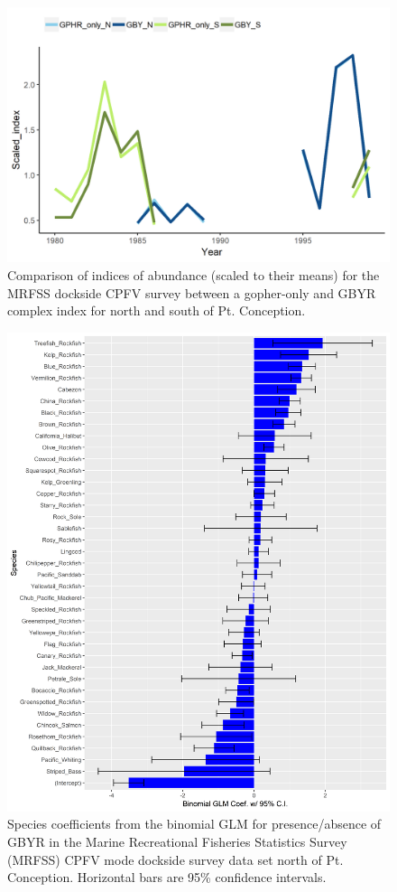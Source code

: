 \documentclass[12pt,]{article}
\begin{document}
\begin{figure}
\centering
\includegraphics{Figures/MRFSS_index_compare.png}
\caption{Comparison of indices of abundance (scaled to their means) for
the MRFSS dockside CPFV survey between a gopher-only and GBYR complex
index for north and south of Pt. Conception.
\label{fig:MRFSS_index_compare}}
\end{figure}

\begin{figure}
\centering
\includegraphics{Figures/Fleet10_SM_filter.png}
\caption{Species coefficients from the binomial GLM for presence/absence
of GBYR in the Marine Recreational Fisheries Statistics Survey (MRFSS)
CPFV mode dockside survey data set north of Pt. Conception. Horizontal
bars are 95\% confidence intervals. \label{fig:Fleet10_SM_filter}}
\end{figure}
\end{document}
